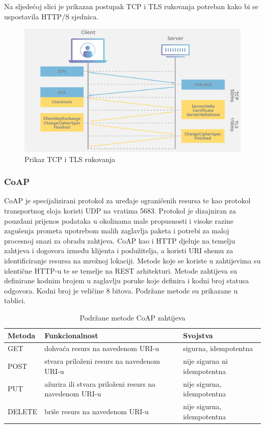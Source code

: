 \documentclass[times, utf8, diplomski]{fer}
\begin{document}
Na sljedećoj slici je prikazan postupak TCP i TLS rukovanja potreban kako bi se uspostavila HTTP/S sjednica.
\begin{figure}[htb]
    \centering
    \includegraphics[width=14cm]{images/tls.png}
    \caption{Prikaz TCP i TLS rukovanja\citep{TLS}}
    \label{fig:tls}
\end{figure}

\subsubsection{CoAP}
CoAP \citep{COAP} je specijalizirani protokol za uređaje ograničenih resursa te kao protokol transportnog sloja koristi UDP na vratima 5683. Protokol je dizajniran za pouzdani prijenos podataka u okolinama male propusnosti i visoke razine zagušenja prometa upotrebom malih zaglavlja paketa i potrebi za maloj procesnoj snazi za obradu zahtjeva. CoAP kao i HTTP djeluje na temelju zahtjeva i dogovora između klijenta i poslužitelja, a koristi URI shemu za identificiranje resursa na mrežnoj lokaciji. Metode koje se koriste u zahtijevima su identične HTTP-u te se temelje na REST  arhitekturi. Metode zahtijeva su definirane kodnim brojem u zaglavlju poruke koje definira i kodni broj statusa odgovora. Kodni broj je veličine 8 bitova. Podržane metode su prikazane u tablici.
\begin{table}[H]
    \centering
    \caption{Podržane metode CoAP zahtijeva}
    \begin{tabular}{| L | L | R |} 
    \hline
    \textbf{Metoda} & \textbf{Funkcionalnost} & \textbf{Svojstva}\\
    \hline\hline
    GET & dohvaća resurs na navedenom URI-u & sigurna, idempotentna \\
    \hline
    POST & stvara priloženi resurs na navedenom URI-u & nije sigurna ni idempotentna \\ 
    \hline
    PUT & ažurira ili stvara priloženi resurs na navedenom URI-u & nije sigurna, idempotentna \\ 
    \hline
    DELETE & briše resurs na navedenom URI-u & nije sigurna, idempotentna \\ 
    \hline
    \end{tabular}
    \label{tab:coap}
\end{table} 
\end{document}

